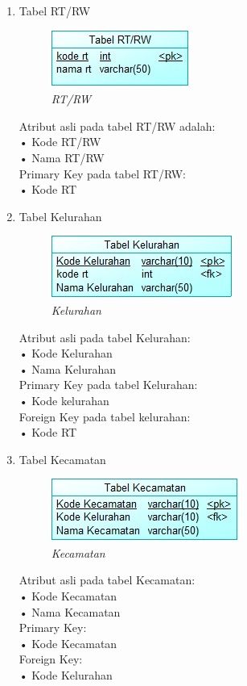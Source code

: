 \documentclass[12pt,a4paper,bahasa]{article}
\begin{document}
\begin{enumerate}


\item Tabel RT/RW\\
\begin{figure}[!htbp]
\centering
\includegraphics[scale=1.0]{gambar/Rt.jpeg}
\caption{\textit{RT/RW}}
\label{RT/RW}
\end{figure}
Atribut asli pada tabel RT/RW adalah:\\
•	Kode RT/RW \\
•	Nama RT/RW\\
Primary Key pada tabel RT/RW:\\
•	Kode RT

\item Tabel Kelurahan\\
\begin{figure}[!htbp]
\centering
\includegraphics[scale=1.0]{gambar/Kelurahan.jpeg}
\caption{\textit{Kelurahan}}
\label{Kelurahan}
\end{figure}
Atribut asli pada tabel Kelurahan:\\
•	Kode Kelurahan\\
•	Nama Kelurahan\\
Primary Key pada tabel Kelurahan:\\
•	Kode kelurahan\\
Foreign Key pada tabel kelurahan:\\
•	Kode RT

\item Tabel Kecamatan\\
\begin{figure}[!htbp]
\centering
\includegraphics[scale=1.0]{gambar/Kecamatan.jpeg}
\caption{\textit{Kecamatan}}
\label{Kecamatan}
\end{figure}
Atribut asli pada tabel Kecamatan:\\
•	Kode Kecamatan\\
•	Nama Kecamatan\\
Primary Key:\\
•	Kode Kecamatan\\
Foreign Key:\\
•	Kode Kelurahan


\end{enumerate}
\end{document}
